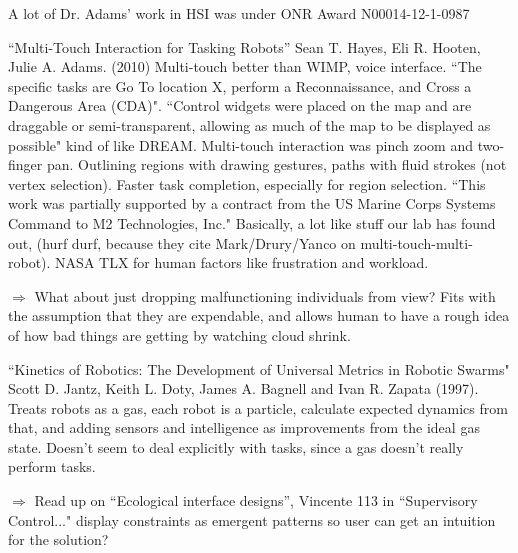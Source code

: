 \documentclass[]{article}
\begin{document}
A lot of Dr. Adams' work in HSI was under ONR Award N00014-12-1-0987

``Multi-Touch Interaction for Tasking Robots'' \cite{hayes2010multi} Sean T. Hayes, Eli R. Hooten, Julie A. Adams. (2010) Multi-touch better than WIMP, voice interface. ``The specific tasks are Go To location X, perform a Reconnaissance, and Cross a Dangerous Area (CDA)". ``Control widgets were placed on the map and are draggable or semi-transparent, allowing as much of the map to be displayed as possible" kind of like DREAM. Multi-touch interaction was pinch zoom and two-finger pan. Outlining regions with drawing gestures, paths with fluid strokes (not vertex selection). Faster task completion, especially for region selection. ``This work was partially supported by a contract from the US Marine Corps Systems Command to M2 Technologies, Inc." Basically, a lot like stuff our lab has found out, (hurf durf, because they cite Mark/Drury/Yanco on multi-touch-multi-robot). NASA TLX for human factors like frustration and workload. 

$\Rightarrow$ What about just dropping malfunctioning individuals from view? Fits with the assumption that they are expendable, and allows human to have a rough idea of how bad things are getting by watching cloud shrink. 


``Kinetics of Robotics: The Development of Universal Metrics in Robotic Swarms" \cite{jantz1997kinetics} Scott D. Jantz, Keith L. Doty, James A. Bagnell and Ivan R. Zapata (1997). Treats robots as a gas, each robot is a particle, calculate expected dynamics from that, and adding sensors and intelligence as improvements from the ideal gas state. Doesn't seem to deal explicitly with tasks, since a gas doesn't really perform tasks. 

$\Rightarrow$ Read up on ``Ecological interface designs'', Vincente 113 in ``Supervisory Control..." display constraints as emergent patterns so user can get an intuition for the solution? 
\end{document}

